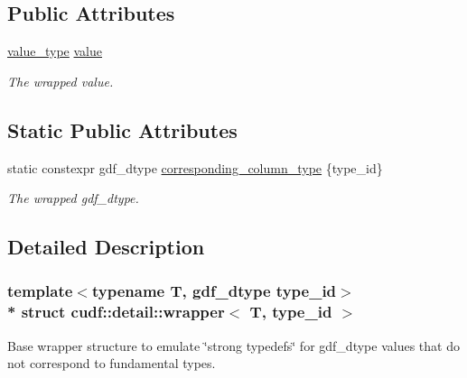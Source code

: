 \subsection*{Public Attributes}
\begin{DoxyCompactItemize}
\item 
\hyperlink{structcudf_1_1detail_1_1wrapper_a8acf68753d62cd6210b6c4b69fdaebef}{value\+\_\+type} \hyperlink{structcudf_1_1detail_1_1wrapper_a5914e8dde1ed708adda58f7ad68561f7}{value}\hypertarget{structcudf_1_1detail_1_1wrapper_a5914e8dde1ed708adda58f7ad68561f7}{}\label{structcudf_1_1detail_1_1wrapper_a5914e8dde1ed708adda58f7ad68561f7}

\begin{DoxyCompactList}\small\item\em The wrapped value. \end{DoxyCompactList}\end{DoxyCompactItemize}
\subsection*{Static Public Attributes}
\begin{DoxyCompactItemize}
\item 
static constexpr gdf\+\_\+dtype \hyperlink{structcudf_1_1detail_1_1wrapper_a363155d601be28d9979f088c3d846ecd}{corresponding\+\_\+column\+\_\+type} \{type\+\_\+id\}\hypertarget{structcudf_1_1detail_1_1wrapper_a363155d601be28d9979f088c3d846ecd}{}\label{structcudf_1_1detail_1_1wrapper_a363155d601be28d9979f088c3d846ecd}

\begin{DoxyCompactList}\small\item\em The wrapped gdf\+\_\+dtype. \end{DoxyCompactList}\end{DoxyCompactItemize}


\subsection{Detailed Description}
\subsubsection*{template$<$typename T, gdf\+\_\+dtype type\+\_\+id$>$\\*
struct cudf\+::detail\+::wrapper$<$ T, type\+\_\+id $>$}

Base wrapper structure to emulate \char`\"{}strong typedefs\char`\"{} for gdf\+\_\+dtype values that do not correspond to fundamental types. 

